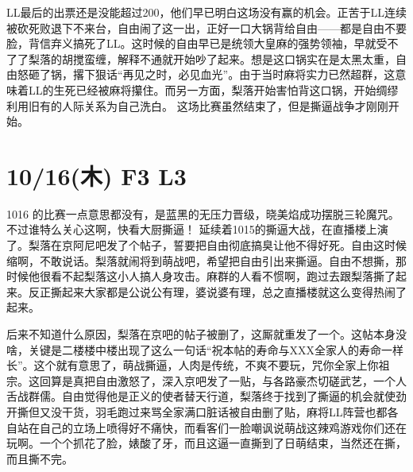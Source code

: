 LL最后的出票还是没能超过200，他们早已明白这场没有赢的机会。正苦于LL连续被砍死败退下不来台，自由闹了这一出，正好一口大锅背给自由——都是自由不要脸，背信弃义搞死了LL。这时候的自由早已是统领大皇麻的强势领袖，早就受不了了梨落的胡搅蛮缠，解释不通就开始吵了起来。想是这口锅实在是太黑太重，自由怒砸了锅，撂下狠话“再见之时，必见血光”。由于当时麻将实力已然超群，这意味着LL的生死已经被麻将攥住。而另一方面，梨落开始害怕背这口锅，开始绸缪利用旧有的人际关系为自己洗白。
这场比赛虽然结束了，但是撕逼战争才刚刚开始。

\section{10/16(木) F3 L3}


1016 的比赛一点意思都没有，是蓝黑的无压力晋级，晓美焰成功摆脱三轮魔咒。不过谁特么关心这啊，快看大厨撕逼！
延续着1015的撕逼大战，在直播楼上演了。梨落在京阿尼吧发了个帖子，誓要把自由彻底搞臭让他不得好死。自由这时候缩啊，不敢说话。梨落就闹将到萌战吧，希望把自由引出来撕逼。自由不想撕，那时候他很看不起梨落这小人搞人身攻击。麻群的人看不惯啊，跑过去跟梨落撕了起来。反正撕起来大家都是公说公有理，婆说婆有理，总之直播楼就这么变得热闹了起来。

后来不知道什么原因，梨落在京吧的帖子被删了，这厮就重发了一个。这帖本身没啥，关键是二楼楼中楼出现了这么一句话“祝本帖的寿命与XXX全家人的寿命一样长”。这个就有意思了，萌战撕逼，人肉是传统，不爽不要玩，咒你全家上你祖宗。这回算是真把自由激怒了，深入京吧发了一贴，与各路豪杰切磋武艺，一个人舌战群儒。自由觉得他是正义的使者替天行道，梨落终于找到了撕逼的机会就使劲开撕但又没干货，羽毛跑过来骂全家满口脏话被自由删了贴，麻将LL阵营也都各自站在自己的立场上喷得好不痛快，而看客们一脸嘲讽说萌战这辣鸡游戏你们还在玩啊。一个个抓花了脸，婊酸了牙，而且这逼一直撕到了日萌结束，当然还在撕，而且撕不完。

